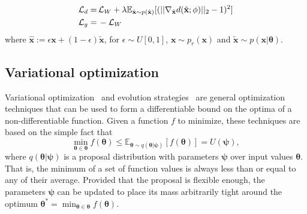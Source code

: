 \documentclass[twocolumn,superscriptaddress,aps]{revtex4-1}
\newcommand{\bftheta}{{\bm \theta}}
\newcommand{\bfpsi}{{\bm \psi}}
\theoremstyle{plain}
\begin{document}
\begin{align}
    {\cal L}_d =\,&  {\cal L}_W + \lambda \mathbb{E}_{\hat{\mathbf{x}} \sim p({\hat{\mathbf{x}})}} [(|| \nabla_{\hat{\mathbf{x}}} d({\hat{\mathbf{x}}};\phi) ||_2 - 1)^2] \\
    {\cal L}_g =\,& - {\cal L}_W
\end{align}
where ${\hat{\mathbf{x}}} := \epsilon \mathbf{x} +
(1-\epsilon)\tilde{\mathbf{x}}$, for $\epsilon \sim U[0,1]$, $\mathbf{x} \sim
p_r(\mathbf{x})$ and $\tilde{\mathbf{x}} \sim p(\mathbf{x}|\bftheta)$.


\subsection{Variational optimization}

Variational optimization~\cite{2012arXiv1212.4507S,staines2013optimization} and evolution strategies~\citep{2011arXiv1106.4487W} are general
optimization techniques that can be used to form a differentiable bound
on the optima of a non-differentiable function. Given a function $f$ to minimize,
these techniques are based on the simple fact that
\begin{equation}
    \min_{\bftheta \in \bftheta} f(\bftheta) \leq \mathbb{E}_{\bftheta \sim q(\bftheta|\bfpsi)} [f(\bftheta)] = U(\bfpsi),
\end{equation}
where $q(\bftheta|\bfpsi)$ is a proposal distribution with parameters $\bfpsi$ over input values $\bftheta$.
That is, the minimum of a set of function values is always less than or equal
to any of their average. Provided that the proposal is flexible enough, the parameters $\bfpsi$
can be updated to place its mass arbitrarily tight around the optimum $\bftheta^* = \min_{\bftheta \in \bftheta} f(\bftheta)$.
\end{document}
